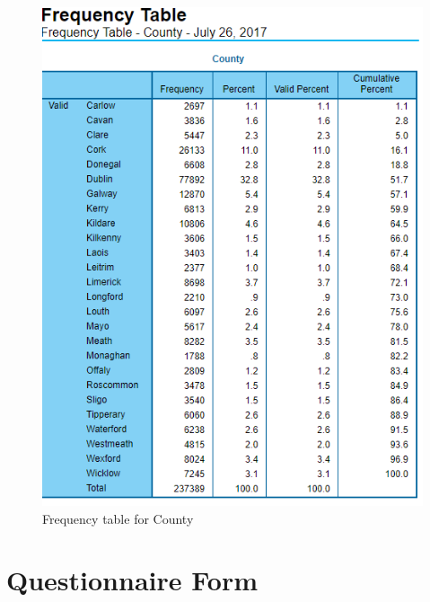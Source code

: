 \begin{center}
\begin{figure}[!htb]
\includegraphics[scale=0.6]{freq1.png}
\centering
\caption{Frequency table for County}
\label{fig:git}
\end{figure}
\end{center}

\chapter{Questionnaire Form}\label{C.Appendix2}

